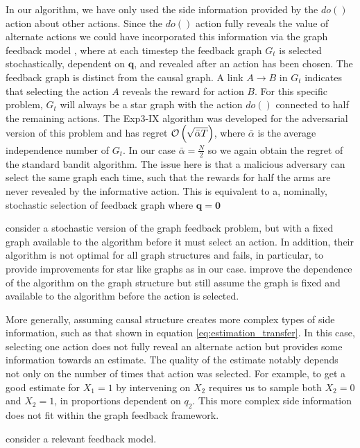 In our algorithm, we have only used the side information provided by the $do()$ action about other actions. Since the $do()$ action fully reveals the value of alternate actions we could have incorporated this information via the graph feedback model \cite{Mannor2011}, where at each timestep the feedback graph $G_t$ is selected stochastically, dependent on $\boldsymbol{q}$, and revealed after an action has been chosen. The feedback graph is distinct from the causal graph. A link $A \rightarrow B$ in $G_t$ indicates that selecting the action $A$ reveals the reward for action $B$. For this specific problem, $G_t$ will always be a star graph with the action $do()$ connected to half the remaining actions. The Exp3-IX algorithm \cite{Kocak2014} was developed for the adversarial version of this problem and has regret $\mathcal{O}\left( \sqrt{\bar{\alpha}T} \right)$, where $\bar{\alpha}$ is the average independence number of $G_t$. In our case $\bar{\alpha} = \frac{N}{2}$ so we again obtain the regret of the standard bandit algorithm. The issue here is that a malicious adversary can select the same graph each time, such that the rewards for half the arms are never revealed by the informative action. This is equivalent to a, nominally, stochastic selection of feedback graph where $\boldsymbol{q} = \boldsymbol{0}$

\cite{Lelarge2012} consider a stochastic version of the graph feedback problem, but with a fixed graph available to the algorithm before it must select an action. In addition, their algorithm is not optimal for all graph structures and fails, in particular, to provide improvements for star like graphs as in our case. \cite{Buccapatnam2014} improve the dependence of the algorithm on the graph structure but still assume the graph is fixed and available to the algorithm before the action is selected. 

More generally, assuming causal structure creates more complex types of side information, such as that shown in equation \ref{eq:estimation_transfer}. In this case, selecting one action does not fully reveal an alternate action but provides some information towards an estimate. The quality of the estimate notably depends not only on the number of times that action was selected. For example, to get a good estimate for $X_1 = 1$ by intervening on $X_2$ requires us to sample both $X_2=0$ and $X_2=1$, in proportions dependent on $q_2$. This more complex side information does not fit within the graph feedback framework.

\cite{wu2015online} consider a relevant feedback model. 


